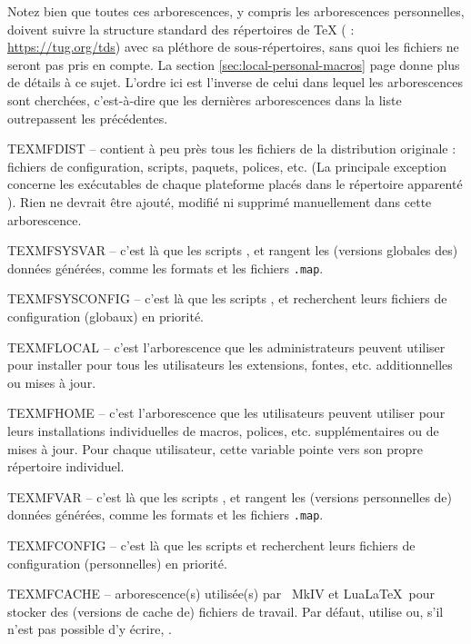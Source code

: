 \documentclass[german, english, french]{article}
\begin{document}
Notez bien que toutes ces arborescences, y compris les arborescences
personnelles, doivent suivre la structure standard des répertoires de \TeX{}
(\TDS{} : \url{https://tug.org/tds}) avec sa pléthore de sous-répertoires, sans
quoi les fichiers ne seront pas pris en compte. La section
\ref{sec:local-personal-macros} page \pageref{sec:local-personal-macros} donne
plus de détails à ce sujet. L'ordre ici est l'inverse de celui dans lequel les
arborescences sont cherchées, c'est-à-dire que les dernières arborescences dans
la liste outrepassent les précédentes.

\begin{ttdescription}
\item[TEXMFDIST] -- contient à peu près tous les fichiers de la distribution
  originale : fichiers de configuration, scripts, paquets, polices, etc. (La
  principale exception concerne les exécutables de chaque plateforme placés
  dans le répertoire apparenté ).  Rien ne devrait être ajouté,
  modifié ni supprimé manuellement dans cette arborescence.
\item[TEXMFSYSVAR] -- c'est là que les scripts ,
   et  rangent les (versions globales
  des) données générées, comme les formats et les fichiers \verb+.map+.
\item[TEXMFSYSCONFIG] -- c'est là que les scripts ,
   et  recherchent leurs fichiers de
  configuration (globaux) en priorité.
\item[TEXMFLOCAL] -- c'est l'arborescence que les administrateurs peuvent
  utiliser pour installer pour tous les utilisateurs les extensions, fontes,
  etc. additionnelles ou mises à jour.
\item[TEXMFHOME] -- c'est l'arborescence que les utilisateurs peuvent utiliser
  pour leurs installations individuelles de macros, polices,
  etc. supplémentaires ou de mises à jour.  Pour chaque utilisateur, cette
  variable pointe vers son propre répertoire individuel.
\item[TEXMFVAR] -- c'est là que les scripts ,
   et  rangent les (versions
  personnelles de) données générées, comme les formats et les fichiers
  \verb+.map+.
\item[TEXMFCONFIG] -- c'est là que les scripts 
   et  recherchent leurs fichiers de
  configuration (personnelles) en priorité.
\item[TEXMFCACHE] -- arborescence(s) utilisée(s) par \ConTeXt\ MkIV et LuaLaTeX\
  pour stocker des (versions de cache de) fichiers de travail. Par défaut,
  utilise \code{TEXMFSYSVAR} ou, s'il n'est pas possible d'y écrire,
  \code{TEXMFVAR}.
\end{ttdescription}
\end{document}
